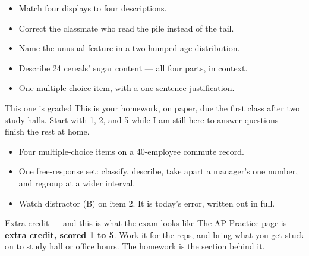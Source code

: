 \documentclass[aspectratio=169, 11pt]{beamer}
\begin{document}
\begin{frame}[t, plain]
  \begin{itemize}\setlength{\itemsep}{5pt}
    \item Match four displays to four descriptions.
    \item Correct the classmate who read the pile instead of the tail.
    \item Name the unusual feature in a two-humped age distribution.
    \item Describe 24 cereals' sugar content --- all four parts, in context.
    \item One multiple-choice item, with a one-sentence justification.
  \end{itemize}
  \begin{block}{This one is graded}
    This is your  homework, on paper, due the first class after two study halls.
    Start with 1, 2, and 5 while I am still here to answer questions --- finish the rest at
    home.
  \end{block}
\end{frame}

\begin{frame}[t, plain]
  \begin{itemize}\setlength{\itemsep}{5pt}
    \item Four multiple-choice items on a 40-employee commute record.
    \item One free-response set: classify, describe, take apart a manager's one number, and
          regroup at a wider interval.
    \item Watch distractor (B) on item 2. It is today's error, written out in full.
  \end{itemize}
  \begin{block}{Extra credit --- and this is what the exam looks like}
    The AP Practice page is \textbf{extra credit, scored 1 to 5}. Work it for the reps, and bring what you
    get stuck on to study hall or office hours. The  homework is the section
    behind it.
  \end{block}
\end{frame}
\end{document}
